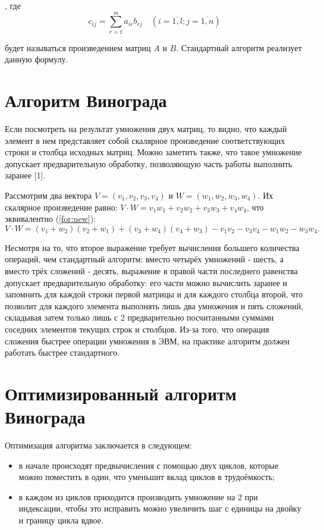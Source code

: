 \documentclass[12pt]{report}
\begin{document}
, где
\begin{equation}
	\label{eq:M}
	c_{ij} =
	\sum_{r=1}^{m} a_{ir}b_{rj} \quad (i=\overline{1,l}; j=\overline{1,n})
\end{equation}

будет называться произведением матриц $A$ и $B$.
Стандартный алгоритм реализует данную формулу.

\section{Алгоритм Винограда}

Если посмотреть на результат умножения двух матриц, то видно, что каждый элемент в нем представляет собой скалярное произведение соответствующих строки и столбца исходных матриц.
Можно заметить также, что такое умножение допускает предварительную обработку, позволяющую часть работы выполнить заранее [1].

Рассмотрим два вектора $V = (v_1, v_2, v_3, v_4)$ и $W = (w_1, w_2, w_3, w_4)$.
Их скалярное произведение равно: $V \cdot W = v_1w_1 + v_2w_2 + v_3w_3 + v_4w_4$, что эквивалентно (\ref{for:new}):
\begin{equation}
	\label{for:new}
	V \cdot W = (v_1 + w_2)(v_2 + w_1) + (v_3 + w_4)(v_4 + w_3) - v_1v_2 - v_3v_4 - w_1w_2 - w_3w_4.
\end{equation}

Несмотря на то, что второе выражение требует вычисления большего количества операций, чем стандартный алгоритм: вместо четырёх умножений - шесть, а вместо трёх сложений - десять, выражение в правой части последнего равенства допускает предварительную обработку: его части можно вычислить заранее и запомнить для каждой строки первой матрицы и для каждого столбца второй, что позволит для каждого элемента выполнять лишь два умножения и пять сложений, складывая затем только лишь с 2 предварительно посчитанными суммами соседних элементов текущих строк и столбцов.
Из-за того, что операция сложения быстрее операции умножения в ЭВМ, на практике алгоритм должен работать быстрее стандартного.

\section{Оптимизированный алгоритм Винограда}

Оптимизация алгоритма заключается в следующем:
\begin{itemize}
	\item в начале происходят предвычисления с помощью двух циклов, которые можно поместить в один, что уменьшит вклад циклов в трудоёмкость;
	\item в каждом из циклов приходится производить умножение на 2 при индексации, чтобы это исправить можно увеличить шаг с единицы на двойку и границу цикла вдвое.
\end{itemize}
\end{document}
